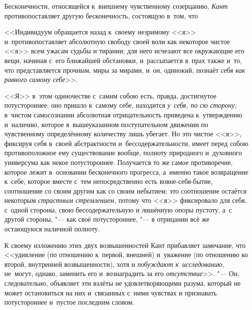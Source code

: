 Бесконечности, относящейся к~внешнему чувственному созерцанию, {\em Кант}
противопоставляет другую бесконечность, состоящую в~том, что

<<Индивидуум обращается назад к~своему незримому <<я>> и~противопоставляет
абсолютную свободу своей воли как некоторое чистое <<я>> всем ужасам судьбы
и тирании; для него исчезают все окружающие его вещи, начиная с~его ближайшей
обстановки, и~рассыпается в~прах также и~то, что представляется прочным, миры
за мирами, и~он, одинокий, познаёт {\em себя как равного самому себе}>>.

<<Я>> в~этом одиночестве с~самим собою есть, правда, достигнутое потустороннее;
оно пришло к~самому себе, находится {\em у~себя, по сю сторону;} в~чистом
самосознании абсолютная отрицательность приведена к~утверждению и~наличию,
которое в~вышеуказанном поступательном движении по чувственному определённому
количеству лишь убегает. Но это чистое <<я>>, фиксируя себя в~своей
абстрактности и~бессодержательности, имеет перед собою противоположное ему
существование вообще, полноту природного и~духовного универсума как некое
потустороннее. Получается то же самое противоречие, которое лежит в~основании
бесконечного прогресса, а~именно такое возвращение к~себе, которое вместе с~тем
непосредственно есть вовне-себя-бытие, соотношение со своим другим как со своим
небытием; это соотношение остаётся некоторым {\em страстным стремлением,}
потому что <<я>> фиксировало для себя, с~одной стороны, свою бессодержательную
и лишённую опоры пустоту, а~с другой стороны, "--- как своё потустороннее, "---
в отрицании всё же остающуюся наличной полноту.

К своему изложению этих двух возвышенностей Кант прибавляет замечание, что
<<удивление (по отношению к~первой, внешней) и~уважение (по отношению ко
второй, внутренней возвышенности), хотя и {\em побуждают к~исследованию,}
не~могут, однако, заменить его и~вознаградить за его
{\em отсутствие}>>. "--- Он, следовательно, объявляет эти взлёты не удовлетворяющими
разума, который не может остановиться на них и~связанных с~ними чувствах и
признавать потустороннее и~пустое последним словом.

